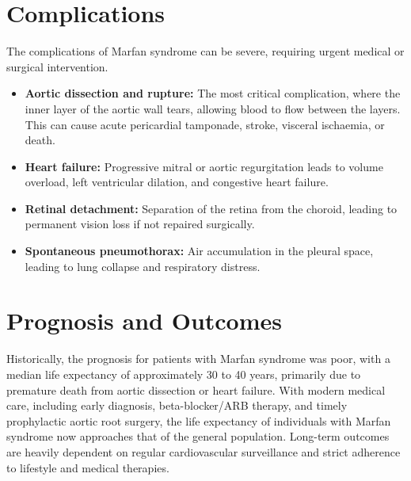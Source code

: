 \section*{Complications}
The complications of Marfan syndrome can be severe, requiring urgent medical or surgical intervention.
\begin{itemize}
    \item \textbf{Aortic dissection and rupture:} The most critical complication, where the inner layer of the aortic wall tears, allowing blood to flow between the layers. This can cause acute pericardial tamponade, stroke, visceral ischaemia, or death.
    \item \textbf{Heart failure:} Progressive mitral or aortic regurgitation leads to volume overload, left ventricular dilation, and congestive heart failure.
    \item \textbf{Retinal detachment:} Separation of the retina from the choroid, leading to permanent vision loss if not repaired surgically.
    \item \textbf{Spontaneous pneumothorax:} Air accumulation in the pleural space, leading to lung collapse and respiratory distress.
\end{itemize}

\section*{Prognosis and Outcomes}
Historically, the prognosis for patients with Marfan syndrome was poor, with a median life expectancy of approximately 30 to 40 years, primarily due to premature death from aortic dissection or heart failure. With modern medical care, including early diagnosis, beta-blocker/ARB therapy, and timely prophylactic aortic root surgery, the life expectancy of individuals with Marfan syndrome now approaches that of the general population. Long-term outcomes are heavily dependent on regular cardiovascular surveillance and strict adherence to lifestyle and medical therapies.

